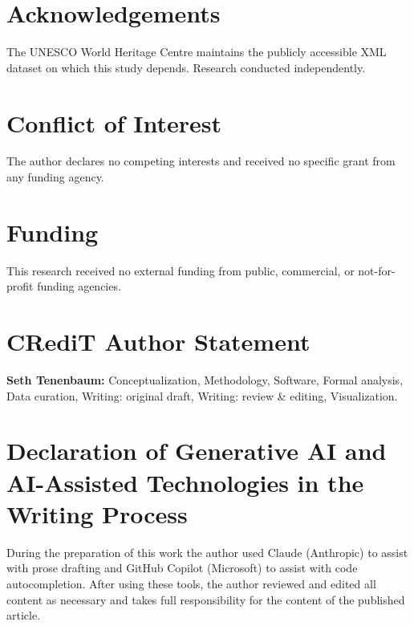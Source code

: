 \documentclass[12pt,a4paper]{article}
\begin{document}
\section*{Acknowledgements}
The UNESCO World Heritage Centre maintains the publicly accessible XML
dataset on which this study depends. Research conducted independently.

\section*{Conflict of Interest}
The author declares no competing interests and received no specific
grant from any funding agency.

\section*{Funding}
This research received no external funding from public, commercial, or
not-for-profit funding agencies.

\section*{CRediT Author Statement}
\textbf{Seth Tenenbaum:} Conceptualization, Methodology, Software,
Formal analysis, Data curation, Writing: original draft,
Writing: review \& editing, Visualization.

\section*{Declaration of Generative AI and AI-Assisted Technologies
  in the Writing Process}
During the preparation of this work the author used Claude
(Anthropic) to assist with prose drafting and GitHub Copilot
(Microsoft) to assist with code autocompletion. After using these
tools, the author reviewed and edited all content as necessary and
takes full responsibility for the content of the published article.
\end{document}
